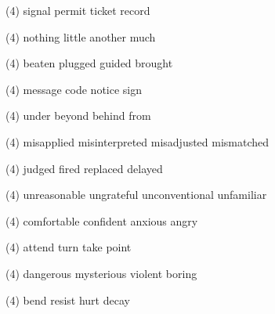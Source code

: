 \item
\begin{tasks}(4)
	\task signal
	\task permit
	\task ticket
	\task record
\end{tasks}
\item
\begin{tasks}(4)
	\task nothing
	\task little
	\task another
	\task much
\end{tasks}
\item
\begin{tasks}(4)
	\task beaten
	\task plugged
	\task guided
	\task brought
\end{tasks}
\item
\begin{tasks}(4)
	\task message
	\task code
	\task notice
	\task sign
\end{tasks}
\item
\begin{tasks}(4)
	\task under
	\task beyond
	\task behind
	\task from
\end{tasks}
\item
\begin{tasks}(4)
	\task misapplied
	\task misinterpreted
	\task misadjusted
	\task mismatched
\end{tasks}
\item
\begin{tasks}(4)
	\task judged
	\task fired
	\task replaced
	\task delayed
\end{tasks}
\item
\begin{tasks}(4)
	\task unreasonable
	\task ungrateful
	\task unconventional
	\task unfamiliar
\end{tasks}
\item
\begin{tasks}(4)
	\task comfortable
	\task confident
	\task anxious
	\task angry
\end{tasks}
\item
\begin{tasks}(4)
	\task attend
	\task turn
	\task take
	\task point
\end{tasks}
\item
\begin{tasks}(4)
	\task dangerous
	\task mysterious
	\task violent
	\task boring
\end{tasks}
\item
\begin{tasks}(4)
	\task bend
	\task resist
	\task hurt
	\task decay
\end{tasks}
\item
